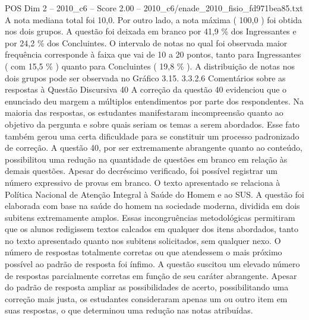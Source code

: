 \begin{textsample}{POS Dim 2 – 2010\_c6 – Score 2.00 – 2010\_c6/enade\_2010\_fisio\_fd971bea85.txt}
A nota mediana total foi 10,0.
Por outro lado, a nota máxima ( 100,0 ) foi obtida nos dois grupos.
A questão foi deixada em branco por 41,9 \% dos Ingressantes e por 24,2 \% dos Concluintes.
O intervalo de notas no qual foi observada maior frequência corresponde à faixa que vai de 10 a 20 pontos, tanto para Ingressantes ( com 15,5 \% ) quanto para Concluintes ( 19,8 \% ).
A distribuição de notas nos dois grupos pode ser observada no Gráfico 3.15. 3.3.2.6 Comentários sobre as respostas à Questão Discursiva 40 A correção da questão 40 evidenciou que o enunciado deu margem a múltiplos entendimentos por parte dos respondentes.
Na maioria das respostas, os estudantes manifestaram incompreensão quanto ao objetivo da pergunta e sobre quais seriam os temas a serem abordados.
Esse fato também gerou uma certa dificuldade para se constituir um processo padronizado de correção.
A questão 40, por ser extremamente abrangente quanto ao conteúdo, possibilitou uma redução na quantidade de questões em branco em relação às demais questões.
Apesar do decréscimo verificado, foi possível registrar um número expressivo de provas em branco.
O texto apresentado se relaciona à Política Nacional de Atenção Integral à Saúde do Homem e ao SUS.
A questão foi elaborada com base na saúde do homem na sociedade moderna, dividida em dois subitens extremamente amplos.
Essas incongruências metodológicas permitiram que os alunos redigissem textos calcados em qualquer dos itens abordados, tanto no texto apresentado quanto nos subitens solicitados, sem qualquer nexo.
O número de respostas totalmente corretas ou que atendessem o mais próximo possível ao padrão de resposta foi ínfimo.
A questão suscitou um elevado número de respostas parcialmente corretas em função de seu caráter abrangente.
Apesar do padrão de resposta ampliar as possibilidades de acerto, possibilitando uma correção mais justa, os estudantes consideraram apenas um ou outro item em suas respostas, o que determinou uma redução nas notas atribuídas.

\end{textsample}
